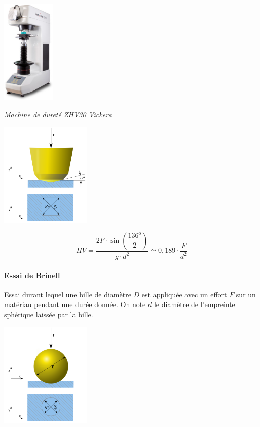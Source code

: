 \documentclass[11pt,oneside]{article}
\begin{document}
\begin{minipage}[c]{.45\linewidth}
\begin{center}
\includegraphics[height=5cm]{png/vickers}

\textit{Machine de dureté ZHV30 Vickers \cite{zwick}}
\end{center}
\end{minipage} \hfill
\begin{minipage}[c]{.45\linewidth}
\begin{center}
\includegraphics[height=5cm]{png/vickers_2}
\end{center}
\end{minipage}

\begin{resultat}
$$
HV = \dfrac{2F\cdot \sin\left(\dfrac{136^{\text{o}}}{2} \right)}{g\cdot d^2}
\simeq 0,189 \cdot \dfrac{F}{d^2}
$$
\end{resultat}


\paragraph*{Essai de Brinell}

\begin{minipage}[c]{.45\linewidth}
Essai durant lequel une bille de diamètre $D$ est appliquée avec un effort $F$ sur un matériau pendant une durée donnée. On note $d$ le diamètre de l'empreinte sphérique laissée par la bille. 
\end{minipage} \hfill
\begin{minipage}[c]{.45\linewidth}
\begin{center}
\includegraphics[height=5cm]{png/brinell}
\end{center}
\end{minipage}
\end{document}
